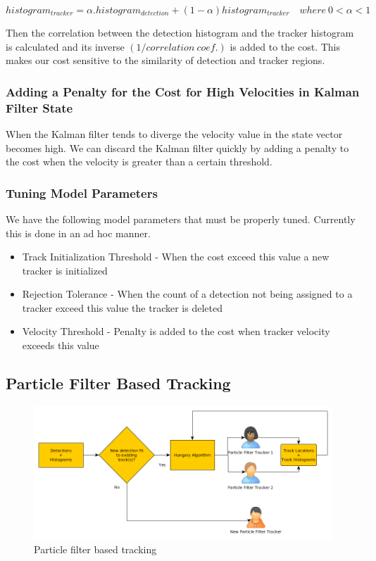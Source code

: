 \documentclass[12pt,a4paper]{report}
\begin{document}
\begin{equation}
histogram_{tracker} = \alpha. histogram_{detection} + (1-\alpha) histogram_{tracker} \quad where \ 0 < \alpha < 1
\end{equation}

Then the correlation between the detection histogram and the tracker histogram is calculated and its inverse $(1/correlation \ coef.)$ is added to the cost. This makes our cost sensitive to the similarity of detection and tracker regions.

\subsubsection{Adding a Penalty for the Cost for High Velocities in Kalman Filter State}

When the Kalman filter tends to diverge the velocity value in the state vector becomes high. We can discard the Kalman filter quickly by adding a penalty to the cost when the velocity is greater than a certain threshold.

\subsubsection{Tuning Model Parameters}
We have the following model parameters that must be properly tuned. Currently this is done in an ad hoc manner.

\begin{itemize}
\item Track Initialization Threshold - When the cost exceed this value a new tracker is initialized
\item Rejection Tolerance - When the count of a detection not being assigned to a tracker exceed this value the tracker is deleted
\item Velocity Threshold - Penalty is added to the cost when tracker velocity exceeds this value
\end{itemize}

\subsection{Particle Filter Based Tracking}
\begin{figure}[H]
\includegraphics[width=\textwidth]{particle_filter.png}
\centering
\caption{Particle filter based tracking}
\label{particle}
\end{figure}
\end{document}
